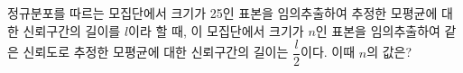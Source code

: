 정규분포를 따르는 모집단에서 크기가 25인 표본을 임의추출하여 추정한 모평균에 대한 신뢰구간의 길이를 $l$이라 할 때, 이 모집단에서 크기가 $n$인 표본을 임의추출하여 같은 신뢰도로 추정한 모평균에 대한 신뢰구간의 길이는 $\dfrac{l}{2}$이다. 이때 $n$의 값은?
